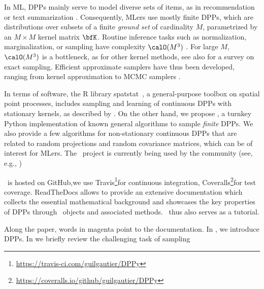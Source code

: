 \documentclass[twoside,11pt]{article}
\begin{document}
    In ML, DPPs mainly serve to model diverse sets of items, as in recommendation \citep{KaDeKo16, GaPaKo16} or text summarization \citep{DuBa18}.
    Consequently, MLers  use mostly finite DPPs, which are distributions over subsets of a finite \emph{ground set} of cardinality $M$, parametrized by an $M\times M$ kernel matrix $\bfK$.
    Routine inference tasks such as normalization, marginalization, or sampling have complexity $\calO(M^3)$ \citep{Gil14}.
    For large $M$, $\calO(M^3)$ is a bottleneck, as for other kernel methods, see also \citet{TrBaAm18} for a survey on exact sampling.
    Efficient approximate samplers have thus been developed, ranging from kernel approximation \citep{AKFT13} to MCMC samplers \citep{AnGhRe16, LiJeSr16c, GaBaVa17}.

    In terms of software, the R library \textsf{spatstat}\ \citep{BaTu05}, a general-purpose toolbox on spatial point processes, includes sampling and learning of continuous DPPs with stationary kernels, as described by \citet{LaMoRu15}.
    On the other hand, we propose \DPPy, a turnkey Python implementation of known general algorithms to sample \emph{finite} DPPs.
    We also provide a few algorithms for non-stationary continuous DPPs that are related to random projections and random covariance matrices, which can be of interest for MLers.
    The \DPPy\ project is currently being used by the community (see, e.g., \citealp{BuRaWi19,Kam18,Pou19,DeCaVa19,GaBaVa19})
    \setcounter{footnote}{3}

    \DPPy\ is hosted on GitHub,\!we use \setcounter{footnote}{5}Travis\!\footnote{\url{https://travis-ci.com/guilgautier/DPPy}}for continuous integration, Coveralls\!\footnote{\url{https://coveralls.io/github/guilgautier/DPPy}}for test coverage.
    ReadTheDocs \! allows to provide an extensive documentation which collects the essential mathematical background and showcases the key properties of DPPs through \DPPy\ objects and associated methods.
    \DPPy\ thus also serves as a tutorial.

    Along the paper, words in magenta point to the documentation.
    In , we introduce DPPs. In  we briefly review the challenging task of sampling


\end{document}

